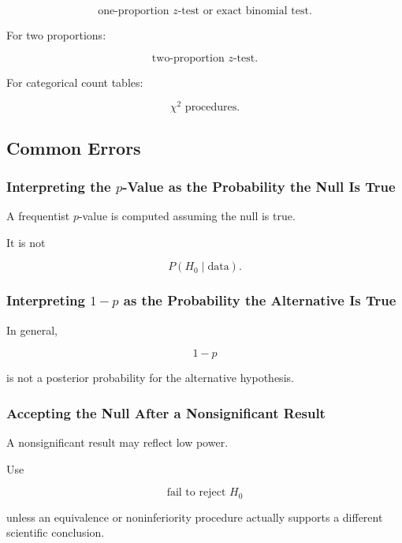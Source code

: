 \[
\boxed{
\text{one-proportion }z\text{-test or exact binomial test}.
}
\]

For two proportions:

\[
\boxed{
\text{two-proportion }z\text{-test}.
}
\]

For categorical count tables:

\[
\boxed{
\chi^2\text{ procedures}.
}
\]

\subsection{Common Errors}
\label{subsec:hypothesis-testing-common-errors}

\subsubsection{Interpreting the \(p\)-Value as the Probability the Null Is True}

A frequentist \(p\)-value is computed assuming the null is true.

It is not

\[
P(H_0\mid\text{data}).
\]

\subsubsection{Interpreting \(1-p\) as the Probability the Alternative Is True}

In general,

\[
\boxed{
1-p
}
\]

is not a posterior probability for the alternative hypothesis.

\subsubsection{Accepting the Null After a Nonsignificant Result}

A nonsignificant result may reflect low power.

Use

\[
\boxed{
\text{fail to reject }H_0
}
\]

unless an equivalence or noninferiority procedure actually supports a
different scientific conclusion.

